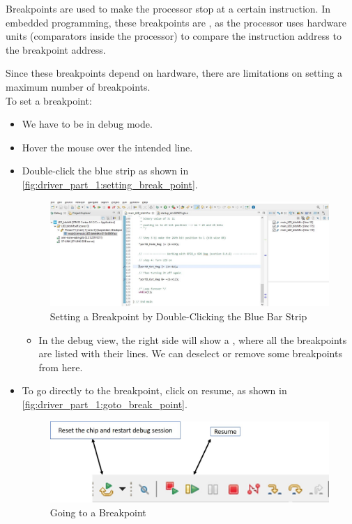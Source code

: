 Breakpoints are used to make the processor stop at a certain instruction. In embedded programming, these breakpoints are , as the processor uses hardware units (comparators inside the processor) to compare the instruction address to the breakpoint address.

Since these breakpoints depend on hardware, there are limitations on setting a maximum number of breakpoints.\\



\newpage
To set a breakpoint:


\begin{itemize}
    \item We have to be in debug mode.

    \item Hover the mouse over the intended line.


    \item Double-click the blue strip as shown in 
    \autoref{fig:driver_part_1:setting_break_point}.


\begin{figure}[h]
\centering
\includegraphics[scale=0.5]{Figures/driver_part_1/setting_break_point}
\caption{Setting a Breakpoint by Double-Clicking the Blue Bar Strip}
\label{fig:driver_part_1:setting_break_point}
\end{figure}

\begin{itemize}
    \item In the debug view, the right side will show a , where all the breakpoints are listed with their lines. We can deselect or remove some breakpoints from here.
\end{itemize}


    \item To go directly to the breakpoint, click on resume, as shown in \autoref{fig:driver_part_1:goto_break_point}.

  \begin{figure}[h]
\centering
\includegraphics[scale=0.5]{Figures/driver_part_1/goto_break_point}
\caption{Going to a Breakpoint}
\label{fig:driver_part_1:goto_break_point}
\end{figure}  


\end{itemize}
